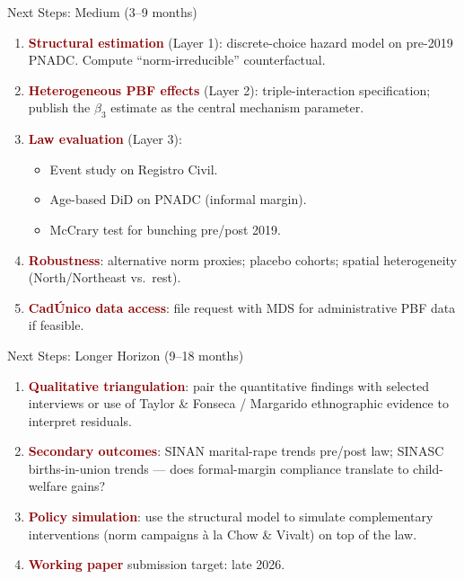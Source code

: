 \documentclass[aspectratio=169,10pt]{beamer}
\newcommand{\hl}[1]{\textcolor{darkred}{\textbf{#1}}}
\begin{document}
\begin{frame}{Next Steps: Medium (3--9 months)}
    \begin{enumerate}
        \item \hl{Structural estimation} (Layer 1): discrete-choice hazard model on pre-2019 PNADC. Compute ``norm-irreducible'' counterfactual.
        \item \hl{Heterogeneous PBF effects} (Layer 2): triple-interaction specification; publish the $\beta_3$ estimate as the central mechanism parameter.
        \item \hl{Law evaluation} (Layer 3):
        \begin{itemize}
            \item Event study on Registro Civil.
            \item Age-based DiD on PNADC (informal margin).
            \item McCrary test for bunching pre/post 2019.
        \end{itemize}
        \item \hl{Robustness}: alternative norm proxies; placebo cohorts; spatial heterogeneity (North/Northeast vs.\ rest).
        \item \hl{CadÚnico data access}: file request with MDS for administrative PBF data if feasible.
    \end{enumerate}
\end{frame}

\begin{frame}{Next Steps: Longer Horizon (9--18 months)}
    \begin{enumerate}
        \item \hl{Qualitative triangulation}: pair the quantitative findings with selected interviews or use of Taylor \& Fonseca / Margarido ethnographic evidence to interpret residuals.
        \item \hl{Secondary outcomes}: SINAN marital-rape trends pre/post law; SINASC births-in-union trends --- does formal-margin compliance translate to child-welfare gains?
        \item \hl{Policy simulation}: use the structural model to simulate complementary interventions (norm campaigns \`a la Chow \& Vivalt) on top of the law.
        \item \hl{Working paper} submission target: late 2026.
    \end{enumerate}
\end{frame}
\end{document}
